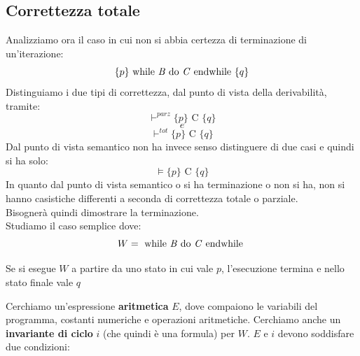 				      				\subsection{Correttezza totale}
				      				Analizziamo ora il caso in cui non si abbia certezza di terminazione di
				      				un'iterazione:
				      				\[\{p\}\mbox{ while \textit{B} do \textit{C} endwhile }\{q\}\]
				      				Distinguiamo i due tipi di correttezza, dal punto di vista della derivabilità,
				      				tramite: 
				      				\[\vdash^{parz}\{p\}\mbox{ C }\{q\}\]
				      				\[e\]
				      				\[\vdash^{tot}\{p\}\mbox{ C }\{q\}\]
				      				Dal punto di vista semantico non ha invece senso distinguere di due casi e
				      				quindi si ha solo:
				      				\[\vDash\{p\}\mbox{ C }\{q\}\]
				      				In quanto dal punto di vista semantico o si ha terminazione o non si ha, non si
				      				hanno casistiche differenti a seconda di correttezza totale o parziale.\\
				      				Bisognerà quindi dimostrare la terminazione.\\
				      				Studiamo il caso semplice dove:
				      				\[W=\mbox{ while \textit{B} do \textit{C} endwhile }\]
				      				\begin{definizione}
				      					Se si esegue $W$  a partire da uno stato in cui vale $p$, l'esecuzione termina e nello stato finale vale $q$
				      				\end{definizione}
				      				Cerchiamo un'espressione \textbf{aritmetica} $E$, dove compaiono le variabili del
				      				programma, costanti numeriche e operazioni aritmetiche. Cerchiamo anche un
				      				\textbf{invariante di ciclo} $i$ (che quindi è una formula) per $W$. $E$ e $i$
				      				devono soddisfare due condizioni:
